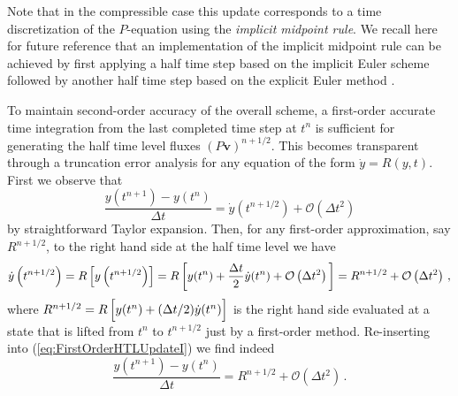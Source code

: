 \documentclass{ametsoc}
\theoremstyle{definition}
\newcommand{\eq}[1]{(\ref{#1})}
\newcommand{\vect}[1]{{\mathbf{#1}}}
\newcommand{\vv}{\vect{v}}
\newcommand{\half}{1/2}
\newcommand{\dt}{\Delta t}
\newcommand{\bigoh}[1]{\mathcal{O}\left(#1\right)}
\begin{document}
Note that in the compressible case this update corresponds to a time 
discretization of the $P$-equation
using the \emph{implicit midpoint rule}. We recall here for future reference that
an implementation of the implicit midpoint rule can be achieved by first applying
a half time step based on the implicit Euler scheme followed by another half time
step based on the explicit Euler method \citep{HairerEtAl2006}.

To maintain second-order accuracy of the overall scheme, a first-order accurate 
time integration from the last completed time step at $t^n$ is sufficient for 
generating the half time level fluxes $(P\vv)^{n+\half}$. This becomes transparent through a truncation error analysis for any equation of 
the form $\dot y = R(y,t)$. First we observe that
%
\begin{equation}\label{eq:FirstOrderHTLUpdateI}
\frac{y(t^{n+1})-y(t^n)}{\dt} = \dot y\left(t^{n+\half}\right) + \bigoh{\dt^2}
\end{equation}
%
by straightforward Taylor expansion. Then, for any first-order approximation, 
say $R^{n+\half}$, to the right hand side at the half time level we have  
%
\begin{equation}\label{eq:FirstOrderHTLUpdateII}
\dot y\left(t^{n+\half}\right) 
= R\left[y\left(t^{n+\half}\right)\right] 
= R\left[y(t^n) + \frac{\Delta t}{2} \dot y(t^n) + \bigoh{\Delta t^2}\rule{0pt}{12pt}\right]
= R^{n+\half} + \bigoh{\dt^2}\,,
\end{equation}
%
where $R^{n+\half} = R\left[y(t^n) + (\Delta t/2) \dot y(t^n)\rule{0pt}{10pt}\right]$ is the right hand side evaluated at a state that is lifted from $t^n$ to $t^{n+\half}$ just by a first-order method. Re-inserting into \eq{eq:FirstOrderHTLUpdateI} we find indeed
%
\begin{equation}
\frac{y(t^{n+1})-y(t^n)}{\dt} = R^{n+\half} + \bigoh{\dt^2}\, .
\end{equation}
%
\end{document}
